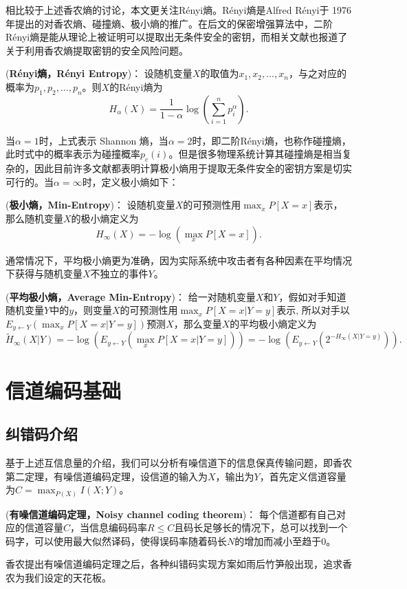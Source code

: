 相比较于上述香农熵的讨论，本文更关注Rényi熵。Rényi熵是Alfred Rényi于 1976 年提出的对香农熵、碰撞熵、极小熵的推广。在后文的保密增强算法中，二阶Rényi熵是能从理论上被证明可以提取出无条件安全的密钥，而相关文献也报道了关于利用香农熵提取密钥的安全风险问题。
\begin{definition}{(\textbf{Rényi熵，Rényi Entropy})：}
	设随机变量$X$的取值为$x_1,x_2,...,x_n$，与之对应的概率为$p_1,p_2,...,p_n$。则$X$的Rényi熵为
	\begin{equation}
		H_{\alpha}(X)=\frac{1}{1-\alpha}\log (\sum_{i=1}^{n}p_i^{\alpha}).
	\end{equation}
\end{definition}
当$\alpha=1$时，上式表示 Shannon 熵，当$\alpha=2$时，即二阶Rényi熵，也称作碰撞熵，此时式中的概率表示为碰撞概率$p_c(i)$。但是很多物理系统计算其碰撞熵是相当复杂的，因此目前许多文献都表明计算极小熵用于提取无条件安全的密钥方案是切实可行的。当$\alpha=\infty$时，定义极小熵如下：
\begin{definition}{(\textbf{极小熵，Min-Entropy})：}
	设随机变量$X$的可预测性用$\max_xP[X=x]$表示，那么随机变量$X$的极小熵定义为
	\begin{equation}
		H_{\infty}(X)=-\log(\max_xP[X=x]).
	\end{equation}
\end{definition}
通常情况下，平均极小熵更为准确，因为实际系统中攻击者有各种因素在平均情况下获得与随机变量$X$不独立的事件$Y$。
\begin{definition}{(\textbf{平均极小熵，Average Min-Entropy})：}
	给一对随机变量$X$和$Y$，假如对手知道随机变量$Y$中的$y$，则变量$X$的可预测性用$\max_x P[X=x|Y=y]$表示, 所以对手以$E_{y\leftarrow Y}(\max_x P[X=x|Y=y])$预测$X$，那么变量$X$的平均极小熵定义为
	\begin{equation}
		\tilde{H}_{\infty}(X|Y)=-\log(E_{y\leftarrow Y}(\max_x P[X=x|Y=y]))=-\log(E_{y\leftarrow Y}(2^{-H_{\infty}(X|Y=y)})).
	\end{equation}
\end{definition}


\section{信道编码基础}
\subsection{纠错码介绍}
基于上述互信息量的介绍，我们可以分析有噪信道下的信息保真传输问题，即香农第二定理，有噪信道编码定理，设信道的输入为$X$，输出为$Y$，首先定义信道容量为$C=\max_{P(X)}I(X;Y)$。
\begin{theorem}{(\textbf{有噪信道编码定理，Noisy channel coding theorem})：}
	每个信道都有自己对应的信道容量$C$，当信息编码码率$R\leq C$且码长足够长的情况下，总可以找到一个码字，可以使用最大似然译码，使得误码率随着码长$N$的增加而减小至趋于0。
\end{theorem}
香农提出有噪信道编码定理之后，各种纠错码实现方案如雨后竹笋般出现\cite{zhuxue2001}，追求香农为我们设定的天花板。


